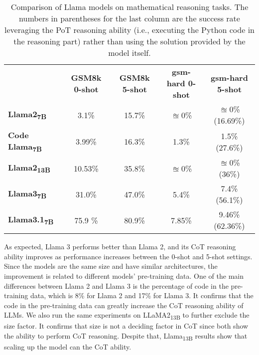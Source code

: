 \begin{table}[h!]
	\centering
	\begin{tabularx}{\textwidth}{Xcccc}
		                                      & \textbf{GSM8k 0-shot} & \textbf{GSM8k 5-shot} & \textbf{gsm-hard 0-shot} & \textbf{gsm-hard 5-shot} \\
		\textbf{Llama2\textsubscript{7B}}     & 3.1\%                 & 15.7\%                & $\approxeq$0\%           & $\approxeq$0\% (16.69\%) \\
		\textbf{Code Llama\textsubscript{7B}} & 3.99\%                & 16.3\%                & 1.3\%                    & 1.5\% (27.6\%)           \\
		\textbf{Llama2\textsubscript{13B}}    & 10.53\%               & 35.8\%                & $\approxeq$0\%           & $\approxeq$0\%	 (36\%)   \\
		\textbf{Llama3\textsubscript{7B}}     & 31.0\%                & 47.0\%                & 5.4\%                    & 7.4\% (56.1\%)           \\
		\textbf{Llama3.1\textsubscript{7B}}   & 75.9 \%               & 80.9\%                & 7.85\%                   & 9.46\% (62.36\%)         \\
	\end{tabularx}
	\caption{Comparison of Llama models on mathematical reasoning tasks. The numbers in parentheses for the last column are the success rate leveraging the PoT reasoning ability (i.e., executing the Python code in the reasoning part) rather than using the solution provided by the model itself.}
	\label{tab:llama-comparison}
\end{table}

As expected, Llama 3 performs better than Llama 2, and its CoT reasoning ability improves as performance increases between the 0-shot and 5-shot settings.
Since the models are the same size and have similar architectures, the improvement is related to different models' pre-training data.
One of the main differences between Llama 2 and Llama 3 is the percentage of code in the pre-training data, which is 8\% for Llama 2 and 17\% for Llama 3.
It confirms that the code in the pre-training data can greatly increase the CoT reasoning ability of LLMs.
We also run the same experiments on LLaMA2\textsubscript{13B} to further exclude the size factor.
It confirms that size is not a deciding factor in CoT since both show the ability to perform CoT reasoning.
Despite that, Llama\textsubscript{13B} results show that scaling up the model can the CoT ability.

